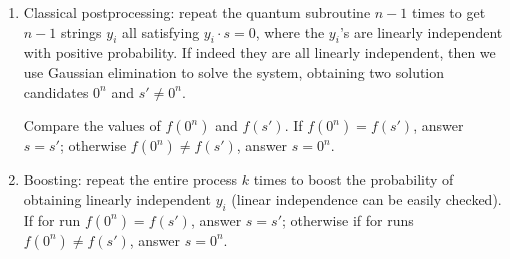 \begin{enumerate}
    \item Classical postprocessing: repeat the quantum subroutine $n-1$ times to get $n-1$ strings $y_i$ all satisfying $y_i \cdot s =0$, where the $y_i$'s are linearly independent with positive probability. If indeed they are all linearly independent, then we use Gaussian elimination to solve the system, obtaining two solution candidates $0^n$ and $s' \neq 0^n$. 
    
    Compare the values of $f(0^n)$ and $f(s')$. If $f(0^n)=f(s')$, answer $s=s'$; otherwise $f(0^n)\neq f(s')$, answer $s=0^n$.
    
    \item Boosting: repeat the entire process $k$ times to boost the probability of obtaining linearly independent $y_i$ (linear independence can be easily checked). If for  run $f(0^n)=f(s')$, answer $s=s'$; otherwise if for  runs $f(0^n)\neq f(s')$, answer $s=0^n$.
\end{enumerate}
    
